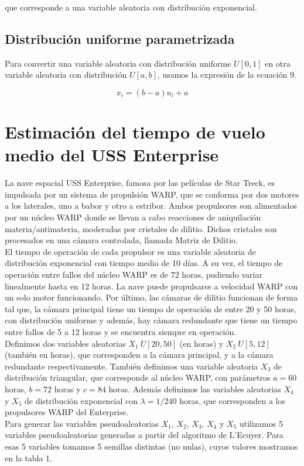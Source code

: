 \documentclass[10pt,journal,compsoc]{IEEEtran}
\begin{document}
que corresponde a una variable aleatoria con distribuci\'on exponencial.

\subsection{Distribuci\'on uniforme parametrizada}
Para convertir una variable aleatoria con distribuci\'on uniforme $U[0,1]$ en otra variable aleatoria con distribuci\'on
$U[a, b]$, usamos la expresi\'on de la ecuaci\'on 9.

\begin{equation}
 x_i = (b-a)u_i + a
\end{equation}

\section{Estimaci\'on del tiempo de vuelo medio del USS Enterprise}
La nave espacial USS Enterprise, famosa por las pel\'iculas de Star Treck, es impulsada por un sistema de propulsi\'on WARP, 
que se conforma por dos motores a los laterales, uno a babor y otro a estribor. Ambos propulsores son alimentados por un n\'ucleo WARP
donde se llevan a cabo reacciones de aniquilaci\'on materia/antimateria, moderadas por cristales de dilitio. Dichos cristales 
son procesados en una c\'amara controlada, llamada Matriz de Dilitio.\\
\indent El tiempo de operaci\'on de cada propulsor es una variable aleatoria de distribuci\'on exponencial con tiempo medio de 10 d\'ias. 
A su vez, el tiempo de operaci\'on entre fallos del n\'ucleo WARP es de 72 horas, pudiendo variar linealmente hasta en 12 horas. 
La nave puede propulsarse a velocidad WARP con un solo motor funcionando. Por \'ultimo, las c\'amaras de dilitio funcionan de forma tal que, la c\'amara principal tiene un tiempo de operaci\'on de entre 
20 y 50 horas, con distribuci\'on uniforme y adem\'as, hay c\'amara redundante que tiene un tiempo entre fallos de 5 a 12 horas y se encuentra siempre en 
operaci\'on.\\

\indent Definimos dos variables aleatorias  $X_1~U[20,50]$ (en horas) y $X_2~U[5, 12]$ (tambi\'en en horas), que corresponden a la c\'amara principal, y a la c\'amara redundante respectivamente. Tambi\'en definimos una variable aleatoria $X_3$ de distribuci\'on 
triangular, que corresponde al n\'ucleo WARP, con par\'ametros $a = 60$ horas, $b = 72$ horas y $c = 84$ horas. Adem\'as
definimos las variables aleatorias $X_4$ y $X_5$ de distribuci\'on exponencial con $\lambda=1/240$ horas, que corresponden a los propulsores WARP del Enterprise.\\
\indent Para generar las variables pseudoaleatorias $X_1$, $X_2$, $X_3$, $X_4$ y $X_5$ utilizamos 5 variables pseudoaleatorias generadas
a partir del algoritmo de L'Ecuyer.  Para esas 5 variables tomamos 5 semillas distintas (no nulas), cuyos valores mostramos en la tabla 1.
\end{document}
